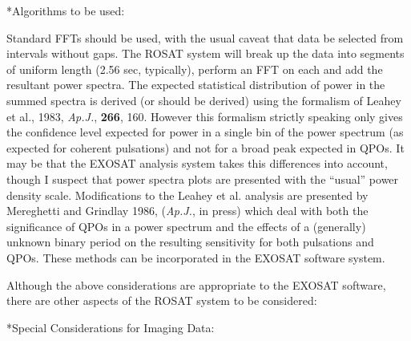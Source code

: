 :

{\list 

Standard FFTs should be used, with the usual caveat that data be
selected from intervals without gaps.  The ROSAT system will break up
the data into segments of uniform length (2.56 sec, typically),
perform an FFT on each and add the resultant power spectra.  The
expected statistical distribution of power in the summed spectra is
derived (or should be derived) using the formalism of Leahey et al.,
1983, {\it Ap.J.}, {\bf 266}, 160.  However this formalism strictly
speaking only gives the confidence level expected for power in a
single bin of the power spectrum (as expected for coherent pulsations)
and not for a broad peak expected in QPOs.  It may be that the EXOSAT
analysis system takes this differences into account, though I suspect
that power spectra plots are presented with the ``usual'' power
density scale.  Modifications to the Leahey et al. analysis are
presented by Mereghetti and Grindlay 1986, ({\it Ap.J.}, in press)
which deal with both the significance of QPOs in a power spectrum and
the effects of a (generally) unknown binary period on the resulting
sensitivity for both pulsations and QPOs.  These methods can be
incorporated in the EXOSAT software system.

Although the above considerations are appropriate to the EXOSAT
software, there are other aspects of the ROSAT system to be
considered:

}

:

